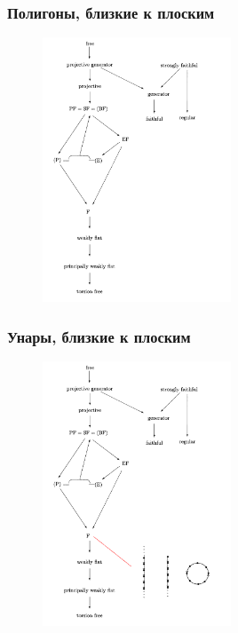 \documentclass[11pt, notheorems]{beamer}
\begin{document}
\begin{frame}
	\frametitle{Полигоны, близкие к плоским}

	\begin{figure}
		\center
		\includegraphics[width=0.5\textwidth]{overview_1.png}
	\end{figure}
\end{frame}

\begin{frame}
	\frametitle{Унары, близкие к плоским}

	\begin{figure}
		\center
		\includegraphics[width=0.5\textwidth]{overview_2.png}
	\end{figure}
\end{frame}
\end{document}
